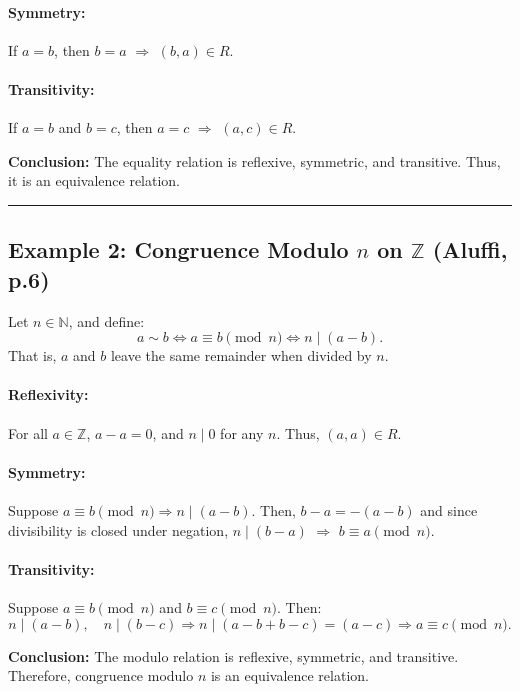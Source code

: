 \documentclass[10pt]{article}
\theoremstyle{plain}
\theoremstyle{definition}
\begin{document}
	\paragraph{Symmetry:} If $a = b$, then $b = a$ $\Rightarrow$ $(b,a) \in R$.
	
	\paragraph{Transitivity:} If $a = b$ and $b = c$, then $a = c$ $\Rightarrow$ $(a,c) \in R$.
	
	\textbf{Conclusion:} The equality relation is reflexive, symmetric, and transitive. Thus, it is an equivalence relation.
	
	\vspace{0.5em}
	\hrule
	\vspace{0.5em}
	
	\subsection*{Example 2: Congruence Modulo $n$ on $\mathbb{Z}$ (Aluffi, p.6)}
	
	Let $n \in \mathbb{N}$, and define:
	\[
	a \sim b \iff a \equiv b \pmod{n} \iff n \mid (a - b).
	\]
	That is, $a$ and $b$ leave the same remainder when divided by $n$.
	
	\paragraph{Reflexivity:} For all $a \in \mathbb{Z}$, $a - a = 0$, and $n \mid 0$ for any $n$. Thus, $(a,a) \in R$.
	
	\paragraph{Symmetry:} Suppose $a \equiv b \pmod{n} \Rightarrow n \mid (a - b)$. Then, $b - a = -(a - b)$ and since divisibility is closed under negation, $n \mid (b - a)$ $\Rightarrow$ $b \equiv a \pmod{n}$.
	
	\paragraph{Transitivity:} Suppose $a \equiv b \pmod{n}$ and $b \equiv c \pmod{n}$. Then:
	\[
	n \mid (a - b),\quad n \mid (b - c) \Rightarrow n \mid (a - b + b - c) = (a - c) \Rightarrow a \equiv c \pmod{n}.
	\]
	
	\textbf{Conclusion:} The modulo relation is reflexive, symmetric, and transitive. Therefore, congruence modulo $n$ is an equivalence relation.
	
\end{document}
